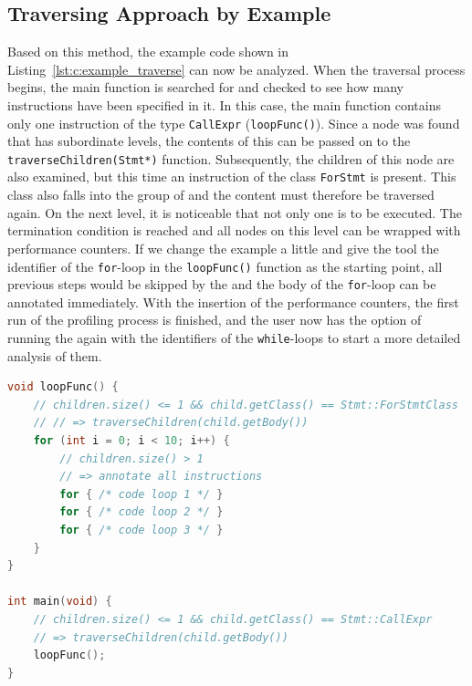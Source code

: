 \subsection{Traversing Approach by Example}
Based on this method, the example code shown in Listing~\ref{lst:c:example_traverse} can now be analyzed. When the traversal process begins, the main function is searched for and checked to see how many instructions have been specified in it. In this case, the main function contains only one instruction of the type \lstinline{CallExpr} (\lstinline{loopFunc()}). Since a node was found that has subordinate levels, the contents of this can be passed on to the \lstinline{traverseChildren(Stmt*)} function. Subsequently, the children of this node are also examined, but this time an instruction of the class \lstinline{ForStmt} is present. This class also falls into the group of \PARSTAS and the content must therefore be traversed again. On the next level, it is noticeable that not only one \LEASTA is to be executed. The termination condition is reached and all nodes on this level can be wrapped with performance counters. If we change the example a little and give the tool the identifier of the \lstinline{for}-loop in the \lstinline{loopFunc()} function as the starting point, all previous steps would be skipped by the \TOOL and the body of the \lstinline{for}-loop can be annotated immediately. With the insertion of the performance counters, the first run of the profiling process is finished, and the user now has the option of running the \TOOL again with the identifiers of the \lstinline{while}-loops to start a more detailed analysis of them.

\begin{lstlisting}[float, language=C++, caption=Example of the Model Used to Traverse the \AST., label=lst:c:example_traverse]
void loopFunc() {
    // children.size() <= 1 && child.getClass() == Stmt::ForStmtClass
    // // => traverseChildren(child.getBody())
    for (int i = 0; i < 10; i++) {
        // children.size() > 1 
        // => annotate all instructions
        for { /* code loop 1 */ }
        for { /* code loop 2 */ }
        for { /* code loop 3 */ }
    }
}

int main(void) {
    // children.size() <= 1 && child.getClass() == Stmt::CallExpr
    // => traverseChildren(child.getBody())
    loopFunc();                                            
}
\end{lstlisting} 


